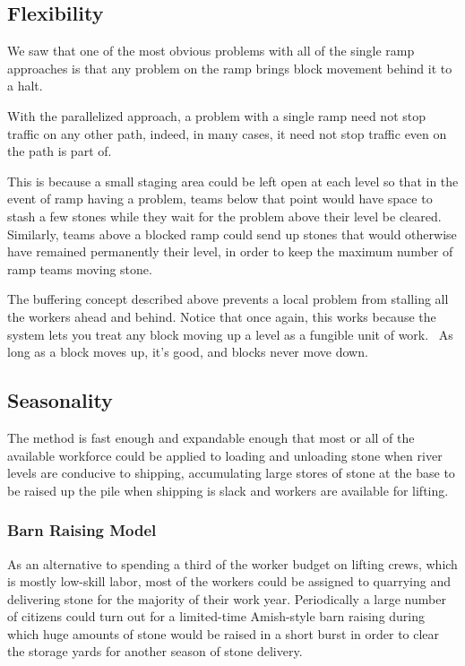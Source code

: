 \documentclass[letterpaper,11pt]{article}
\begin{document}
\subsection{Flexibility}

We saw that one of the most obvious problems with all of the single ramp approaches is that any problem on the ramp brings  
block movement behind it to a halt.

With the parallelized approach, a problem with a single ramp need not stop traffic on any other path, indeed,  
in many cases, it need not stop traffic even on the path is part of.

This is because a small staging area could be left open at each level so that in the event of ramp having a problem, teams below 
that point would have space to stash a few stones 
while they wait for the problem above their level be cleared. Similarly, teams above a blocked ramp could send up stones that would 
otherwise have remained permanently their level, in 
order to keep the maximum number of ramp teams moving stone.

The buffering concept described above prevents a local problem from stalling all the workers ahead and behind. 
Notice that once again, this works because the system lets you treat any block moving up a level as a fungible unit of work.  
As long as a block moves up, it's good, and blocks never move down.


\subsection{Seasonality}

The method is fast enough and expandable enough that most or all of the available workforce could be applied to loading and 
unloading stone when river levels are conducive to shipping, accumulating large stores of stone at the base to be raised up the 
pile when shipping is slack and workers are available for lifting.

\subsubsection{Barn Raising Model}

As an alternative to spending a third of the worker budget on lifting crews, which is mostly low-skill labor, most of 
the workers could be assigned to quarrying and delivering stone for the majority of their work year. 
Periodically a large number of citizens could turn out for a limited-time Amish-style barn raising during which huge amounts 
of stone would be raised in a short burst in order to clear the storage yards for another season of stone delivery.
\end{document}
